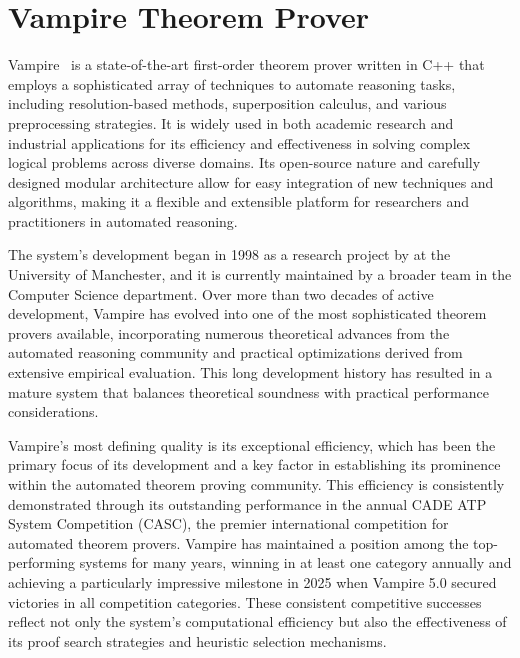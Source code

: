 \chapter{Vampire Theorem Prover}\label{chap:vampire-theorem-prover}
Vampire~\cite{AVATAR,kovacs2013vampire,riazanov2002design} is a state-of-the-art first-order theorem prover written in C++ that employs a sophisticated array of techniques to automate reasoning tasks, including resolution-based methods, superposition calculus, and various preprocessing strategies.
It is widely used in both academic research and industrial applications for its efficiency and effectiveness in solving complex logical problems across diverse domains.
Its open-source nature and carefully designed modular architecture allow for easy integration of new techniques and algorithms, making it a flexible and extensible platform for researchers and practitioners in automated reasoning.

The system's development began in 1998 as a research project by \citeauthor{riazanov2002design} at the University of Manchester, and it is currently maintained by a broader team in the Computer Science department.
Over more than two decades of active development, Vampire has evolved into one of the most sophisticated theorem provers available, incorporating numerous theoretical advances from the automated reasoning community and practical optimizations derived from extensive empirical evaluation.
This long development history has resulted in a mature system that balances theoretical soundness with practical performance considerations.

Vampire's most defining quality is its exceptional efficiency, which has been the primary focus of its development and a key factor in establishing its prominence within the automated theorem proving community.
This efficiency is consistently demonstrated through its outstanding performance in the annual CADE ATP System Competition (CASC), the premier international competition for automated theorem provers.
Vampire has maintained a position among the top-performing systems for many years, winning in at least one category annually and achieving a particularly impressive milestone in 2025 when Vampire 5.0 secured victories in all competition categories.
These consistent competitive successes reflect not only the system's computational efficiency but also the effectiveness of its proof search strategies and heuristic selection mechanisms.

